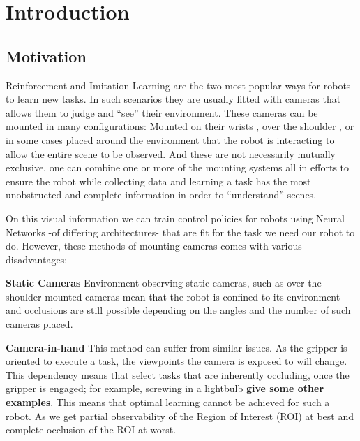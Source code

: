 \chapter{Introduction}
\section{Motivation}
    

  Reinforcement and Imitation Learning are the two most popular ways for robots to learn new tasks. In such scenarios they are usually fitted with cameras that allows them to judge and ``see'' their environment. These cameras can be mounted in many configurations: Mounted on their wrists \cite{chi2024UMIinthewild,openXEmbodimentRoboticLearning2024}, over the shoulder \cite{??}, or in some cases placed around the environment \cite{?} that the robot is interacting to allow the entire scene to be observed. And these are not necessarily mutually exclusive, one can combine one or more of the mounting systems \cite{exploringActiveVision2024chuang} all in efforts to ensure the robot while collecting data and learning a task has the most unobstructed and complete information in order to ``understand'' scenes.


  On this visual information we can train control policies for robots using Neural Networks \cite{spyros1995nnStateOfTheArt, Schmidhuber2015nn} -of differing architectures- that are fit for the task we need our robot to do. However, these methods of mounting cameras comes with various disadvantages:
  
  \textbf{Static Cameras} Environment observing static cameras, such as over-the-shoulder mounted cameras \cite{??} mean that the robot is confined to its environment and occlusions are still possible depending on the angles and the number of such cameras placed.
    
  \textbf{Camera-in-hand} This method can suffer from similar issues. As the gripper is oriented to execute a task, the viewpoints the camera is exposed to will change. This dependency means that select tasks that are inherently occluding, once the gripper is engaged; for example, screwing in a lightbulb \textbf{give some other examples}. This means that optimal learning cannot be achieved for such a robot. As we get partial observability of the Region of Interest (ROI) at best and complete occlusion of the ROI at worst.
    
